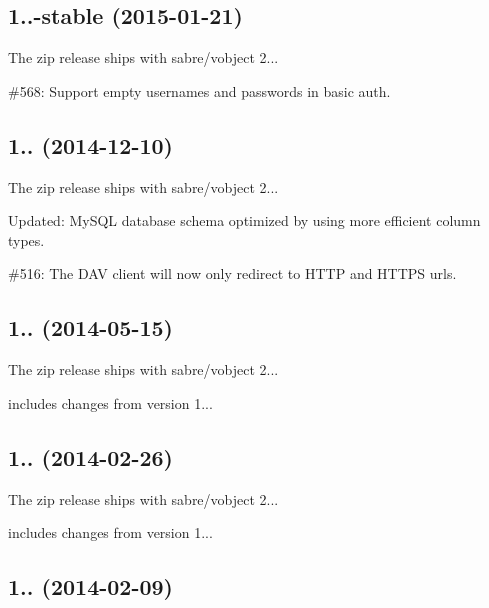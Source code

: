 \subsection*{1..-\/stable (2015-\/01-\/21) }


\begin{DoxyItemize}
\item The zip release ships with sabre/vobject 2...
\item \#568\+: Support empty usernames and passwords in basic auth.
\end{DoxyItemize}

\subsection*{1.. (2014-\/12-\/10) }


\begin{DoxyItemize}
\item The zip release ships with sabre/vobject 2...
\item Updated\+: My\+S\+QL database schema optimized by using more efficient column types.
\item \#516\+: The D\+AV client will now only redirect to H\+T\+TP and H\+T\+T\+PS urls.
\end{DoxyItemize}

\subsection*{1.. (2014-\/05-\/15) }


\begin{DoxyItemize}
\item The zip release ships with sabre/vobject 2...
\item includes changes from version 1...
\end{DoxyItemize}

\subsection*{1.. (2014-\/02-\/26) }


\begin{DoxyItemize}
\item The zip release ships with sabre/vobject 2...
\item includes changes from version 1...
\end{DoxyItemize}

\subsection*{1.. (2014-\/02-\/09) }


